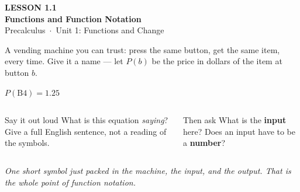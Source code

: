 \documentclass[aspectratio=169, 11pt]{beamer}
\begin{document}
{
\begin{frame}[plain]
  \vspace{2.8cm}\hspace{0.55cm}%
  \begin{minipage}{0.9\textwidth}
    {\color{goldacc}\bfseries\small LESSON 1.1}\\[0.5cm]
    {\color{white}\bfseries\LARGE Functions and Function Notation}\\[1.2cm]
    {\color{lilacmid}\small Precalculus~$\cdot$~Unit 1: Functions and Change}
  \end{minipage}
\end{frame}
}

\begin{frame}[t, plain]

  A vending machine you can trust: press the same button, get the same item,
  every time. Give it a name --- let \(P(b)\) be the price in dollars of the item
  at button \(b\).

  \bigskip
  \begin{center}
    {\Huge\bfseries\color{plum} \(P(\text{B4}) = 1.25\)}
  \end{center}

  \bigskip
  \begin{columns}[T]
      \begin{block}{Say it out loud}
        What is this equation \textit{saying}? Give a full English sentence, not
        a reading of the symbols.
      \end{block}

      \begin{block}{Then ask}
        What is the \textbf{input} here? Does an input have to be a
        \textbf{number}?
      \end{block}
  \end{columns}

  \bigskip
  \textit{One short symbol just packed in the machine, the input, and the
  output. That is the whole point of function notation.}
\end{frame}
\end{document}
